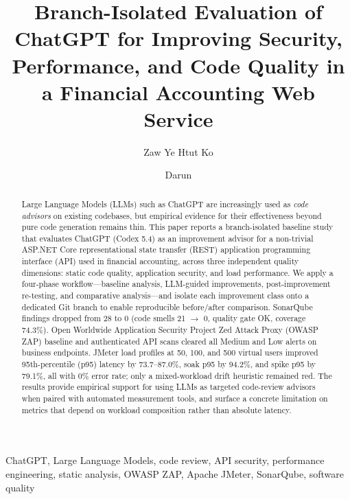 \documentclass[conference,letterpaper]{IEEEtran}
\begin{document}
\title{Branch-Isolated Evaluation of ChatGPT for Improving Security, Performance, and Code Quality in a Financial Accounting Web Service}

\author{Zaw Ye Htut Ko \and Darun}

\maketitle

\begin{abstract}
Large Language Models (LLMs) such as ChatGPT are increasingly used as \emph{code advisors} on existing codebases, but empirical evidence for their effectiveness beyond pure code generation remains thin. This paper reports a branch-isolated baseline study that evaluates ChatGPT (Codex 5.4) as an improvement advisor for a non-trivial ASP.NET Core representational state transfer (REST) application programming interface (API) used in financial accounting, across three independent quality dimensions: static code quality, application security, and load performance. We apply a four-phase workflow---baseline analysis, LLM-guided improvements, post-improvement re-testing, and comparative analysis---and isolate each improvement class onto a dedicated Git branch to enable reproducible before/after comparison. SonarQube findings dropped from 28 to 0 (code smells 21 $\rightarrow$ 0, quality gate OK, coverage 74.3\%). Open Worldwide Application Security Project Zed Attack Proxy (OWASP ZAP) baseline and authenticated API scans cleared all Medium and Low alerts on business endpoints. JMeter load profiles at 50, 100, and 500 virtual users improved 95th-percentile (p95) latency by 73.7--87.0\%, soak p95 by 94.2\%, and spike p95 by 79.1\%, all with 0\% error rate; only a mixed-workload drift heuristic remained red. The results provide empirical support for using LLMs as targeted code-review advisors when paired with automated measurement tools, and surface a concrete limitation on metrics that depend on workload composition rather than absolute latency.
\end{abstract}

\begin{IEEEkeywords}
ChatGPT, Large Language Models, code review, API security, performance engineering, static analysis, OWASP ZAP, Apache JMeter, SonarQube, software quality
\end{IEEEkeywords}
\end{document}
